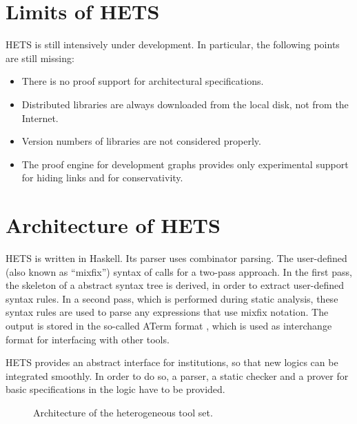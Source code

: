 \documentclass{article}
\newcommand{\normalTEXTSC}[2]{{#1\scriptsize#2}}
\newcommand     {\Hets}{\normalTEXTSC{H}{ETS}\xspace}
\begin{document}
\section{Limits of \Hets}

\Hets is still intensively under development. In particular, the
following points are still missing:

\begin{itemize}
\item There is no proof support for architectural specifications.
\item Distributed libraries are always downloaded from the local disk,
not from the Internet.
\item Version numbers of libraries are not considered properly.
\item The proof engine for development graphs provides only experimental
support for hiding links and for conservativity.
\end{itemize}


\section{Architecture of \Hets}

\Hets is written in Haskell. Its parser uses combinator 
parsing.
The user-defined (also known as ``mixfix'') syntax of \CASL
calls for a two-pass approach. In the first pass, the skeleton of a
\CASL abstract syntax tree is derived, in order to extract user-defined 
syntax rules. In a second pass, which is performed during 
static
analysis, these syntax rules are used to parse 
any expressions that
use mixfix notation. The output is stored in the so-called
ATerm format \cite{BJKO00}, which is used as interchange format
for interfacing with other tools.


\Hets provides an abstract interface for 
institutions, so
that new logics can be integrated smoothly. 
In order to do so, a parser,
a static checker and a prover for basic specifications in the logic have
to be provided.



\begin{figure}
\vspace{1em}

\caption{Architecture of the heterogeneous tool set.
\label{fig:hets}}
\end{figure}
\end{document}
